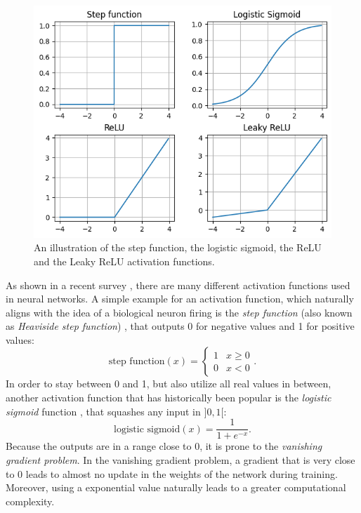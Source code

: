 \begin{figure}
\centering
	\includegraphics[width=0.8\linewidth]{activation-functions.png}
	\caption{An illustration of the step function, the logistic sigmoid, the ReLU and the Leaky ReLU activation functions.}
	\label{activation_functions}
\end{figure}

As shown in a recent survey \cite{activation_functions}, there are many different activation functions used in neural networks. A simple example for an activation function, which naturally aligns with the idea of a biological neuron firing is the \textit{step function} (also known as \textit{Heaviside step function}) \cite{neural_networks_pattern_recognition}, that outputs 0 for negative values and 1 for positive values:
$$\text{step function}(x) = 
\begin{cases}
    1 & x \geq 0\\
    0 & x < 0
\end{cases}.
$$
In order to stay between 0 and 1, but also utilize all real values in between, another activation function that has historically been popular is the \textit{logistic sigmoid} function \cite{activation_functions}, that squashes any input in $]0, 1[$:
$$\text{logistic sigmoid}(x) = \frac{1}{1 + e^{-x}}.$$
Because the outputs are in a range close to 0, it is prone to the \textit{vanishing gradient problem}. In the vanishing gradient problem, a gradient that is very close to 0 leads to almost no update in the weights of the network during training. Moreover, using a exponential value naturally leads to a greater computational complexity. \cite{activation_functions}


